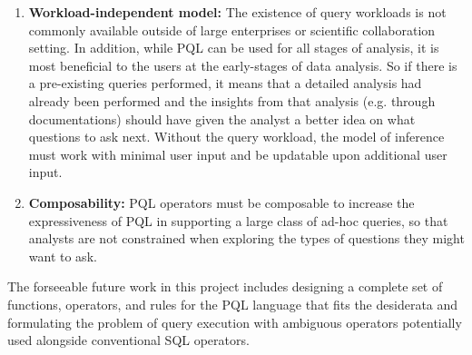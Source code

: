 \documentclass{sig-alternate-05-2015}
\begin{document}
\begin{enumerate}
  \item \textbf{Workload-independent model:} The existence of query workloads is not commonly available outside of large enterprises or scientific collaboration setting. In addition, while PQL can be used for all stages of analysis, it is most beneficial to the users at the early-stages of data analysis. So if there is a pre-existing queries performed, it means that a detailed analysis had already been performed and the insights from that analysis (e.g. through documentations) should have given the analyst a better idea on what questions to ask next. Without the query workload, the model of inference must work with minimal user input and be updatable upon additional user input.
  \item \textbf{Composability:}  PQL operators must be composable to increase the expressiveness of PQL in supporting a large class of ad-hoc queries, so that analysts are not constrained when exploring the types of questions they might want to ask.
\end{enumerate}
\par The forseeable future work in this project includes designing a complete set of functions, operators, and rules for the PQL language that fits the desiderata and formulating the problem of query execution with ambiguous operators potentially used alongside conventional SQL operators.
\end{document}
